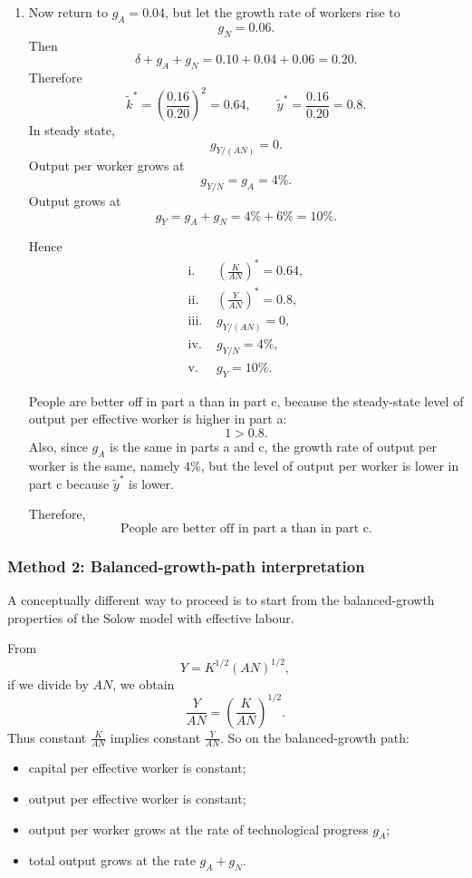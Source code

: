 \documentclass[12pt]{article}
\begin{document}
\begin{enumerate}[label=(\alph*)]
    \item
    Now return to \(g_A=0.04\), but let the growth rate of workers rise to
    \[
    g_N=0.06.
    \]
    Then
    \[
    \delta+g_A+g_N=0.10+0.04+0.06=0.20.
    \]
    Therefore
    \[
    \tilde{k}^*=\left(\frac{0.16}{0.20}\right)^2=0.64,
    \qquad
    \tilde{y}^*=\frac{0.16}{0.20}=0.8.
    \]
    In steady state,
    \[
    g_{Y/(AN)}=0.
    \]
    Output per worker grows at
    \[
    g_{Y/N}=g_A=4\%.
    \]
    Output grows at
    \[
    g_Y=g_A+g_N=4\%+6\%=10\%.
    \]

    Hence
    \[
    \boxed{
    \begin{aligned}
    \text{i. } & \left(\frac{K}{AN}\right)^*=0.64,\\
    \text{ii. } & \left(\frac{Y}{AN}\right)^*=0.8,\\
    \text{iii. } & g_{Y/(AN)}=0,\\
    \text{iv. } & g_{Y/N}=4\%,\\
    \text{v. } & g_Y=10\%.
    \end{aligned}}
    \]

    People are better off in part a than in part c, because the steady-state level of output per effective worker is higher in part a:
    \[
    1 > 0.8.
    \]
    Also, since \(g_A\) is the same in parts a and c, the growth rate of output per worker is the same, namely \(4\%\), but the level of output per worker is lower in part c because \(\tilde{y}^*\) is lower.

    Therefore,
    \[
    \boxed{\text{People are better off in part a than in part c.}}
    \]
\end{enumerate}

\newpage
\subsubsection{Method 2: Balanced-growth-path interpretation}
A conceptually different way to proceed is to start from the balanced-growth properties of the Solow model with effective labour.

From
\[
Y=K^{1/2}(AN)^{1/2},
\]
if we divide by \(AN\), we obtain
\[
\frac{Y}{AN}=\left(\frac{K}{AN}\right)^{1/2}.
\]
Thus constant \(\frac{K}{AN}\) implies constant \(\frac{Y}{AN}\). So on the balanced-growth path:
\begin{itemize}[leftmargin=*]
    \item capital per effective worker is constant;
    \item output per effective worker is constant;
    \item output per worker grows at the rate of technological progress \(g_A\);
    \item total output grows at the rate \(g_A+g_N\).
\end{itemize}
\end{document}
